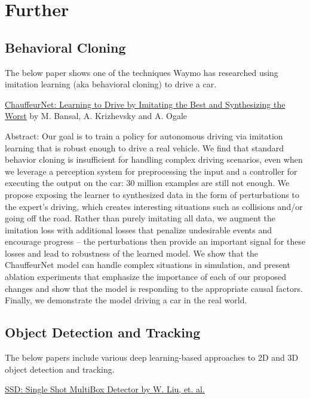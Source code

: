 \documentclass[11pt, a4paper]{article}
\begin{document}
\section{Further}%
\label{sec:further}


\subsection{Behavioral Cloning}%
\label{sub:behavioral_cloning}


The below paper shows one of the techniques Waymo has researched using imitation learning (aka behavioral cloning) to drive a car.

\href{https://arxiv.org/abs/1812.03079}{ChauffeurNet: Learning to Drive by Imitating the Best and Synthesizing the Worst} by M. Bansal, A. Krizhevsky and A. Ogale


Abstract: Our goal is to train a policy for autonomous driving via imitation learning that is robust enough to drive a real vehicle. We find that standard behavior cloning is insufficient for handling complex driving scenarios, even when we leverage a perception system for preprocessing the input and a controller for executing the output on the car: 30 million examples are still not enough. We propose exposing the learner to synthesized data in the form of perturbations to the expert's driving, which creates interesting situations such as collisions and/or going off the road. Rather than purely imitating all data, we augment the imitation loss with additional losses that penalize undesirable events and encourage progress -- the perturbations then provide an important signal for these losses and lead to robustness of the learned model. We show that the ChauffeurNet model can handle complex situations in simulation, and present ablation experiments that emphasize the importance of each of our proposed changes and show that the model is responding to the appropriate causal factors. Finally, we demonstrate the model driving a car in the real world.


\subsection{Object Detection and Tracking}%
\label{sub:object_detection_and_tracking}



The below papers include various deep learning-based approaches to 2D and 3D object detection and tracking.

\href{https://arxiv.org/abs/1512.02325}{SSD: Single Shot MultiBox Detector by W. Liu, et. al.}
\end{document}
